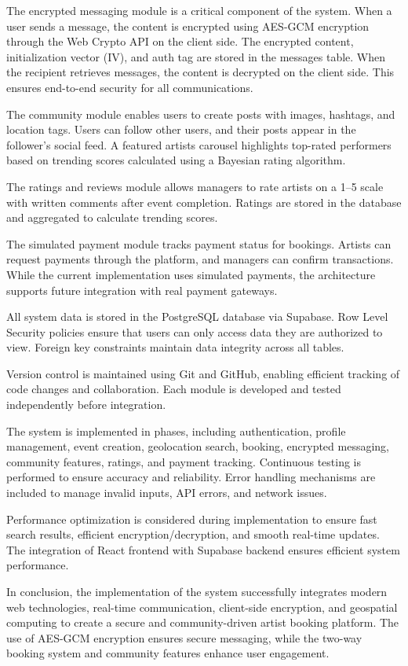 \documentclass[12pt,a4paper]{report}
\begin{document}
The encrypted messaging module is a critical component of the system. When a user sends a message, the content is encrypted using AES-GCM encryption through the Web Crypto API on the client side. The encrypted content, initialization vector (IV), and auth tag are stored in the messages table. When the recipient retrieves messages, the content is decrypted on the client side. This ensures end-to-end security for all communications.

The community module enables users to create posts with images, hashtags, and location tags. Users can follow other users, and their posts appear in the follower's social feed. A featured artists carousel highlights top-rated performers based on trending scores calculated using a Bayesian rating algorithm.

The ratings and reviews module allows managers to rate artists on a 1--5 scale with written comments after event completion. Ratings are stored in the database and aggregated to calculate trending scores.

The simulated payment module tracks payment status for bookings. Artists can request payments through the platform, and managers can confirm transactions. While the current implementation uses simulated payments, the architecture supports future integration with real payment gateways.

All system data is stored in the PostgreSQL database via Supabase. Row Level Security policies ensure that users can only access data they are authorized to view. Foreign key constraints maintain data integrity across all tables.

Version control is maintained using Git and GitHub, enabling efficient tracking of code changes and collaboration. Each module is developed and tested independently before integration.

The system is implemented in phases, including authentication, profile management, event creation, geolocation search, booking, encrypted messaging, community features, ratings, and payment tracking. Continuous testing is performed to ensure accuracy and reliability. Error handling mechanisms are included to manage invalid inputs, API errors, and network issues.

Performance optimization is considered during implementation to ensure fast search results, efficient encryption/decryption, and smooth real-time updates. The integration of React frontend with Supabase backend ensures efficient system performance.

In conclusion, the implementation of the system successfully integrates modern web technologies, real-time communication, client-side encryption, and geospatial computing to create a secure and community-driven artist booking platform. The use of AES-GCM encryption ensures secure messaging, while the two-way booking system and community features enhance user engagement.
\end{document}
